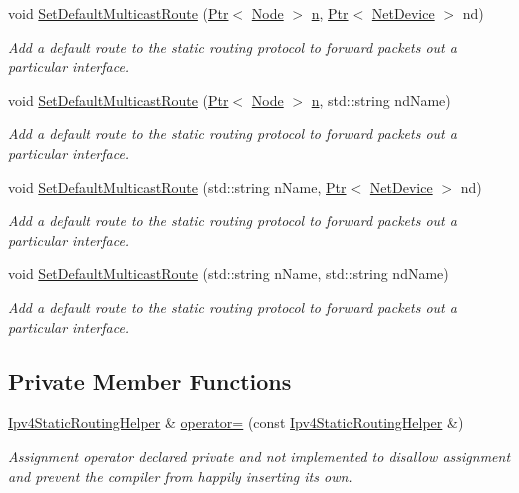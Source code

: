 \begin{DoxyCompactItemize}
void \hyperlink{classns3_1_1Ipv4StaticRoutingHelper_ae69a07ded3139dfd4e21bb7c10eba416}{Set\+Default\+Multicast\+Route} (\hyperlink{classns3_1_1Ptr}{Ptr}$<$ \hyperlink{classns3_1_1Node}{Node} $>$ \hyperlink{lte__link__budget__x2__handover__measures_8m_abdb05bc5a064cf642a06c83b3392f148}{n}, \hyperlink{classns3_1_1Ptr}{Ptr}$<$ \hyperlink{classns3_1_1NetDevice}{Net\+Device} $>$ nd)
\begin{DoxyCompactList}\small\item\em Add a default route to the static routing protocol to forward packets out a particular interface. \end{DoxyCompactList}\item 
void \hyperlink{classns3_1_1Ipv4StaticRoutingHelper_ab755c8e22952804d93c47b914819e1db}{Set\+Default\+Multicast\+Route} (\hyperlink{classns3_1_1Ptr}{Ptr}$<$ \hyperlink{classns3_1_1Node}{Node} $>$ \hyperlink{lte__link__budget__x2__handover__measures_8m_abdb05bc5a064cf642a06c83b3392f148}{n}, std\+::string nd\+Name)
\begin{DoxyCompactList}\small\item\em Add a default route to the static routing protocol to forward packets out a particular interface. \end{DoxyCompactList}\item 
void \hyperlink{classns3_1_1Ipv4StaticRoutingHelper_adcdf30e8246096f94535fb2472bf9701}{Set\+Default\+Multicast\+Route} (std\+::string n\+Name, \hyperlink{classns3_1_1Ptr}{Ptr}$<$ \hyperlink{classns3_1_1NetDevice}{Net\+Device} $>$ nd)
\begin{DoxyCompactList}\small\item\em Add a default route to the static routing protocol to forward packets out a particular interface. \end{DoxyCompactList}\item 
void \hyperlink{classns3_1_1Ipv4StaticRoutingHelper_ac9e71b7b9d1f958df552166cbc210768}{Set\+Default\+Multicast\+Route} (std\+::string n\+Name, std\+::string nd\+Name)
\begin{DoxyCompactList}\small\item\em Add a default route to the static routing protocol to forward packets out a particular interface. \end{DoxyCompactList}\end{DoxyCompactItemize}
\subsection*{Private Member Functions}
\begin{DoxyCompactItemize}
\item 
\hyperlink{classns3_1_1Ipv4StaticRoutingHelper}{Ipv4\+Static\+Routing\+Helper} \& \hyperlink{classns3_1_1Ipv4StaticRoutingHelper_a732a01272d46668aa2cdffa3d05ac3ac}{operator=} (const \hyperlink{classns3_1_1Ipv4StaticRoutingHelper}{Ipv4\+Static\+Routing\+Helper} \&)
\begin{DoxyCompactList}\small\item\em Assignment operator declared private and not implemented to disallow assignment and prevent the compiler from happily inserting its own. \end{DoxyCompactList}\end{DoxyCompactItemize}
